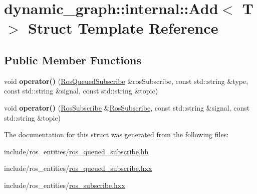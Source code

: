 \hypertarget{structdynamic__graph_1_1internal_1_1Add}{}\section{dynamic\+\_\+graph\+:\+:internal\+:\+:Add$<$ T $>$ Struct Template Reference}
\label{structdynamic__graph_1_1internal_1_1Add}
\subsection*{Public Member Functions}
\begin{DoxyCompactItemize}
\item 
\mbox{\label{structdynamic__graph_1_1internal_1_1Add_a9d0622abc8f4d539373884419740282b}} 
void {\bfseries operator()} (\hyperlink{classdynamic__graph_1_1RosQueuedSubscribe}{Ros\+Queued\+Subscribe} \&ros\+Subscribe, const std\+::string \&type, const std\+::string \&signal, const std\+::string \&topic)
\item 
\mbox{\label{structdynamic__graph_1_1internal_1_1Add_a12302c2102a5966f102a18c983926bb6}} 
void {\bfseries operator()} (\hyperlink{classdynamic__graph_1_1RosSubscribe}{Ros\+Subscribe} \&\hyperlink{classdynamic__graph_1_1RosSubscribe}{Ros\+Subscribe}, const std\+::string \&signal, const std\+::string \&topic)
\end{DoxyCompactItemize}


The documentation for this struct was generated from the following files\+:\begin{DoxyCompactItemize}
\item 
include/ros\+\_\+entities/\hyperlink{ros__queued__subscribe_8hh}{ros\+\_\+queued\+\_\+subscribe.\+hh}\item 
include/ros\+\_\+entities/\hyperlink{ros__queued__subscribe_8hxx}{ros\+\_\+queued\+\_\+subscribe.\+hxx}\item 
include/ros\+\_\+entities/\hyperlink{ros__subscribe_8hxx}{ros\+\_\+subscribe.\+hxx}\end{DoxyCompactItemize}
